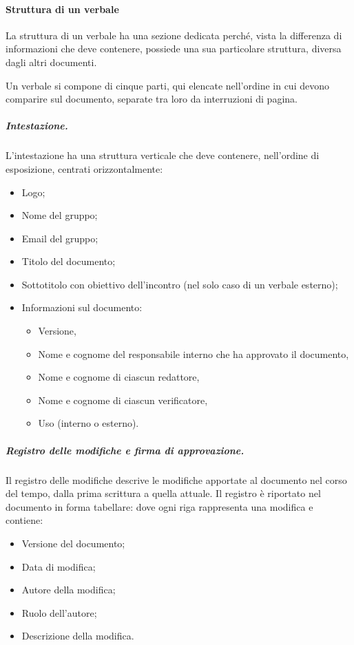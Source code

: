 \paragraph{Struttura di un verbale}
La struttura di un verbale ha una sezione dedicata perché, vista la differenza di informazioni che deve contenere, possiede una sua particolare struttura, diversa dagli altri documenti.
\par Un verbale si compone di cinque parti, qui elencate nell'ordine in cui devono comparire sul documento, separate tra loro da interruzioni di pagina.
\subparagraph{Intestazione.}
L'intestazione ha una struttura verticale che deve contenere, nell'ordine di esposizione, centrati orizzontalmente:
\begin{itemize}
    \item Logo;
    \item Nome del gruppo;
    \item Email del gruppo;
    \item Titolo del documento;
    \item Sottotitolo con obiettivo dell'incontro (nel solo caso di un verbale esterno);
    \item Informazioni sul documento:
    \begin{itemize}
        \item Versione,
        \item Nome e cognome del responsabile interno che ha approvato il documento,
        \item Nome e cognome di ciascun redattore,
        \item Nome e cognome di ciascun verificatore,
        \item Uso (interno o esterno).
    \end{itemize}
\end{itemize}
\subparagraph{Registro delle modifiche e firma di approvazione.}
Il registro delle modifiche descrive le modifiche apportate al documento nel corso del tempo, dalla prima scrittura a quella attuale. Il registro è riportato nel documento in forma tabellare: dove ogni riga rappresenta una modifica e contiene:
\begin{itemize}
    \item Versione del documento;
    \item Data di modifica;
    \item Autore della modifica;
    \item Ruolo dell'autore;
    \item Descrizione della modifica.
\end{itemize}
